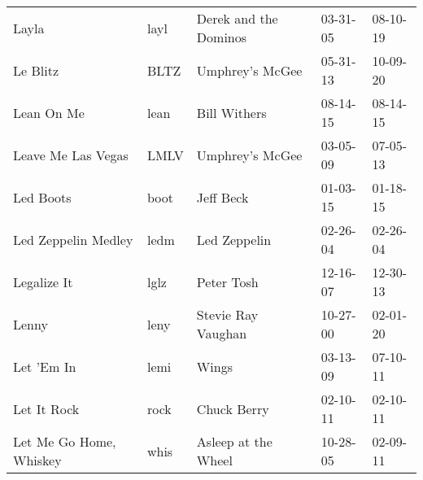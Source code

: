 \begin{longtable}{p{}p{}p{}p{}p{}}
                                                                   Layla &          layl &                                    Derek and the Dominos &              03-31-05 &             08-10-19 \\
                                                                Le Blitz &          BLTZ &                                          Umphrey's McGee &              05-31-13 &             10-09-20 \\
                                                              Lean On Me &          lean &                                             Bill Withers &              08-14-15 &             08-14-15 \\
                                                      Leave Me Las Vegas &          LMLV &                                          Umphrey's McGee &              03-05-09 &             07-05-13 \\
                                                               Led Boots &          boot &                                                Jeff Beck &              01-03-15 &             01-18-15 \\
                                                     Led Zeppelin Medley &          ledm &                                             Led Zeppelin &              02-26-04 &             02-26-04 \\
                                                             Legalize It &          lglz &                                               Peter Tosh &              12-16-07 &             12-30-13 \\
                                                                   Lenny &          leny &                                       Stevie Ray Vaughan &              10-27-00 &             02-01-20 \\
                                                              Let 'Em In &          lemi &                                                    Wings &              03-13-09 &             07-10-11 \\
                                                             Let It Rock &          rock &                                              Chuck Berry &              02-10-11 &             02-10-11 \\
                                                 Let Me Go Home, Whiskey &          whis &                                      Asleep at the Wheel &              10-28-05 &             02-09-11 \\

\end{longtable}
